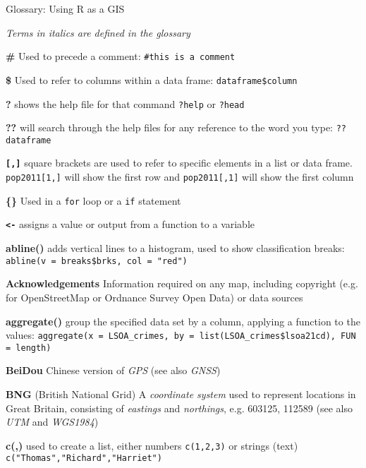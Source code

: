 \documentclass[a4paper,10pt]{article}
\begin{document}

\begin{center}

{\huge Glossary: Using R as a GIS}

\textit{Terms in italics are defined in the glossary}

\end{center}

\begin{multicols}{2}

\textbf{\#} Used to precede a comment: \texttt{\#this is a comment}

\textbf{\$} Used to refer to columns within a data frame: \texttt{dataframe\$column} 

\textbf{?} shows the help file for that command \texttt{?help} or \texttt{?head}

\textbf{??} will search through the help files for any reference to the word you type: \texttt{??dataframe}

\textbf{\texttt{[,]}} square brackets are used to refer to specific elements in a list or data frame. \texttt{pop2011[1,]} will show the first row and \texttt{pop2011[,1]} will show the first column

\textbf{\{\}} Used in a \texttt{for} loop or a \texttt{if} statement

\textbf{\texttt{<-}} assigns a value or output from a function to a variable

\textbf{abline()} adds vertical lines to a histogram, used to show classification breaks: \texttt{abline(v = breaks\$brks, col = "red")}

\textbf{Acknowledgements} Information required on any map, including copyright (e.g. for OpenStreetMap or Ordnance Survey Open Data) or data sources 

\textbf{aggregate()} group the specified data set by a column, applying a function to the values: \texttt{aggregate(x = LSOA\_crimes, by = list(LSOA\_crimes\$lsoa21cd), FUN = length)}

\textbf{BeiDou} Chinese version of \textit{GPS} (see also \textit{GNSS})

\textbf{BNG} (British National Grid) A \textit{coordinate system} used to represent locations in Great Britain, consisting of \textit{eastings} and \textit{northings}, e.g. 603125, 112589 (see also \textit{UTM} and \textit{WGS1984}) 

\textbf{c(,)} used to create a list, either numbers \texttt{c(1,2,3)} or strings (text) \texttt{c("Thomas","Richard","Harriet")}


\end{multicols}
\end{document}

